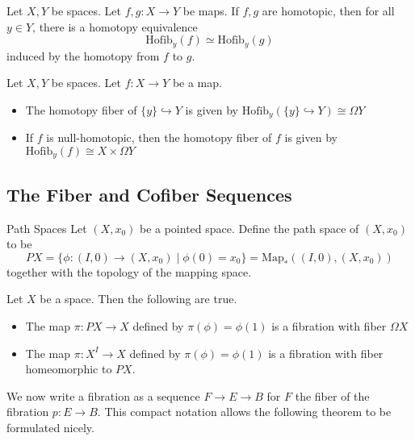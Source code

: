 \documentclass[a4paper]{article}
\begin{document}
\begin{prp}{}{} Let $X,Y$ be spaces. Let $f,g:X\to Y$ be maps. If $f,g$ are homotopic, then for all $y\in Y$, there is a homotopy equivalence $$\text{Hofib}_y(f)\simeq\text{Hofib}_y(g)$$ induced by the homotopy from $f$ to $g$. 
\end{prp}

\begin{eg}{}{} Let $X,Y$ be spaces. Let $f:X\to Y$ be a map. 
\begin{itemize}
\item The homotopy fiber of $\{y\}\hookrightarrow Y$ is given by $\text{Hofib}_y(\{y\}\hookrightarrow Y)\cong\Omega Y$
\item If $f$ is null-homotopic, then the homotopy fiber of $f$ is given by $\text{Hofib}_y(f)\cong X\times\Omega Y$
\end{itemize}
\end{eg}

\subsection{The Fiber and Cofiber Sequences}
\begin{defn}{Path Spaces}{} Let $(X,x_0)$ be a pointed space. Define the path space of $(X,x_0)$ to be $$PX=\{\phi:(I,0)\to(X,x_0)\;|\;\phi(0)=x_0\}=\text{Map}_\ast((I,0),(X,x_0))$$ together with the topology of the mapping space. 
\end{defn}

\begin{thm}{}{} Let $X$ be a space. Then the following are true. 
\begin{itemize}
\item The map $\pi:PX\to X$ defined by $\pi(\phi)=\phi(1)$ is a fibration with fiber $\Omega X$
\item The map $\pi:X^I\to X$ defined by $\pi(\phi)=\phi(1)$ is a fibration with fiber homeomorphic to $PX$. 
\end{itemize}
\end{thm}

We now write a fibration as a sequence $F\to E\to B$ for $F$ the fiber of the fibration $p:E\to B$. This compact notation allows the following theorem to be formulated nicely. 
\end{document}
